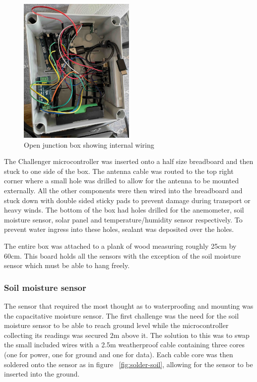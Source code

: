 \begin{figure}[H]
    \centering
    \includegraphics[width=0.5\textwidth]{contents/part-2/fig2/box-internals.jpeg}
    \caption{Open junction box showing internal wiring}
    \label{fig:box-internals}
\end{figure}

The Challenger microcontroller was inserted onto a half size breadboard and then
stuck to one side of the box. The antenna cable was routed to the top right
corner where a small hole was drilled to allow for the antenna to be mounted
externally. All the other components were then wired into the breadboard and
stuck down with double sided sticky pads to prevent damage during transport or
heavy winds. The bottom of the box had holes drilled for the anemometer, soil
moisture sensor, solar panel and temperature/humidity sensor respectively. To
prevent water ingress into these holes, sealant was deposited over the holes.

The entire box was attached to a plank of wood measuring roughly 25cm by 60cm.
This board holds all the sensors with the exception of the soil moisture sensor
which must be able to hang freely.

\subsubsection{Soil moisture sensor}

The sensor that required the most thought as to waterproofing and mounting was
the capacitative moisture sensor. The first challenge was the need for the soil
moisture sensor to be able to reach ground level while the microcontroller
collecting its readings was secured 2m above it. The solution to this was to
swap the small included wires with a 2.5m weatherproof cable containing three
cores (one for power, one for ground and one for data). Each cable core was then
soldered onto the sensor as in figure ~\ref{fig:solder-soil}, allowing for the
sensor to be inserted into the ground.

